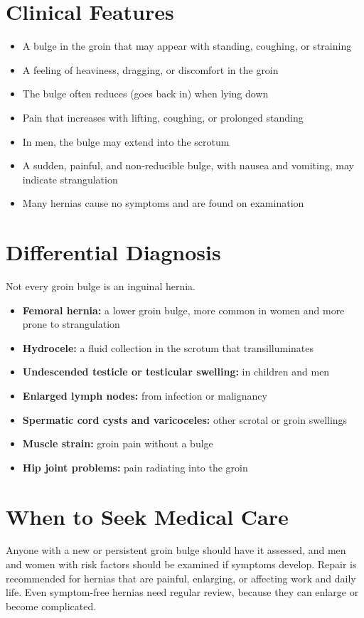 \section*{Clinical Features}
\begin{itemize}
    \item A bulge in the groin that may appear with standing, coughing, or straining
    \item A feeling of heaviness, dragging, or discomfort in the groin
    \item The bulge often reduces (goes back in) when lying down
    \item Pain that increases with lifting, coughing, or prolonged standing
    \item In men, the bulge may extend into the scrotum
    \item A sudden, painful, and non-reducible bulge, with nausea and vomiting, may indicate strangulation
    \item Many hernias cause no symptoms and are found on examination
\end{itemize}

\section*{Differential Diagnosis}
Not every groin bulge is an inguinal hernia.
\begin{itemize}
    \item \textbf{Femoral hernia:} a lower groin bulge, more common in women and more prone to strangulation
    \item \textbf{Hydrocele:} a fluid collection in the scrotum that transilluminates
    \item \textbf{Undescended testicle or testicular swelling:} in children and men
    \item \textbf{Enlarged lymph nodes:} from infection or malignancy
    \item \textbf{Spermatic cord cysts and varicoceles:} other scrotal or groin swellings
    \item \textbf{Muscle strain:} groin pain without a bulge
    \item \textbf{Hip joint problems:} pain radiating into the groin
\end{itemize}

\section*{When to Seek Medical Care}
Anyone with a new or persistent groin bulge should have it assessed, and men and women with risk factors should be examined if symptoms develop. Repair is recommended for hernias that are painful, enlarging, or affecting work and daily life. Even symptom-free hernias need regular review, because they can enlarge or become complicated.

